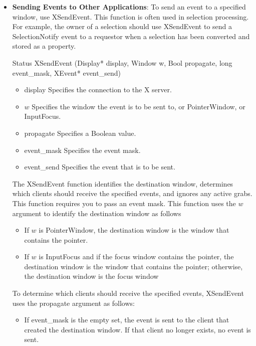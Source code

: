 \documentclass{report}
\begin{document}
\begin{itemize}
        \item \textbf{Sending Events to Other Applications}: To send an event to a specified window, use XSendEvent. This function is often used in selection processing. For example, the owner of a selection should use XSendEvent to send a SelectionNotify event to a requestor when a selection has been converted and stored as a property.
            \bigbreak \noindent 
            \begin{cppcode}
            Status XSendEvent (Display* display, Window w, Bool propagate, long event_mask, XEvent* event_send)
            \end{cppcode}
            \bigbreak \noindent
            \begin{itemize}
                \item display Specifies the connection to the X server.
                \item $w$ Specifies the window the event is to be sent to, or PointerWindow, or InputFocus.
                \item propagate Specifies a Boolean value.
                \item event\_mask Specifies the event mask.
                \item event\_send Specifies the event that is to be sent.
            \end{itemize}
            The XSendEvent function identifies the destination window, determines which clients should receive the specified events, and ignores any active grabs. This function requires you to pass an event mask. 
            \bigbreak \noindent 
            This function uses the $w$ argument to identify the destination window as follows
            \begin{itemize}
                \item If $w$ is PointerWindow, the destination window is the window that contains the pointer.
                \item If $w$ is InputFocus and if the focus window contains the pointer, the destination window is the window that contains the pointer; otherwise, the destination window is the focus window
            \end{itemize}
            To determine which clients should receive the specified events, XSendEvent uses the propagate argument as follows:
            \begin{itemize}
                \item If event\_mask is the empty set, the event is sent to the client that created the destination window. If that client no longer exists, no event is sent.

\end{itemize}
\end{itemize}
\end{document}
